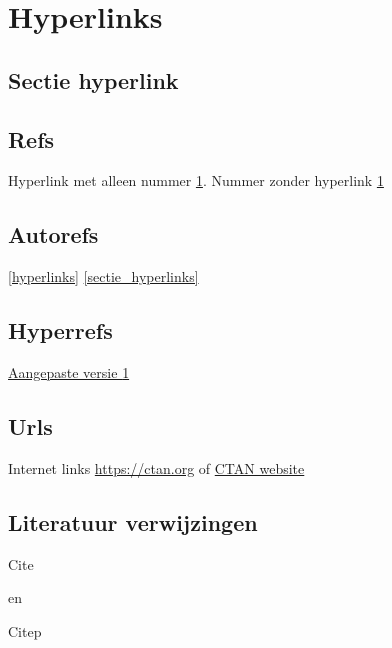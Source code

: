 \chapter{Hyperlinks}
\label{hyperlinks}

\blindtext[7]

\label{page_hyperlinks}

\section{Sectie hyperlink}
\label{sectie_hyperlinks}

\blindtext[7]

\section{Refs}

Hyperlink met alleen nummer \ref{hyperlinks}.  
Nummer zonder hyperlink \ref*{hyperlinks}

\section{Autorefs}

\autoref{hyperlinks}
\autoref{sectie_hyperlinks}

\section{Hyperrefs}

\hyperref[hyperlinks]{Aangepaste versie \ref*{hyperlinks}}

\section{Urls}

Internet links \url{https://ctan.org}
of \href{https://ctan.org}{CTAN website}

\section{Literatuur verwijzingen}

Cite \cite{Martin2018}

en

Citep \citep{Martin2018}
